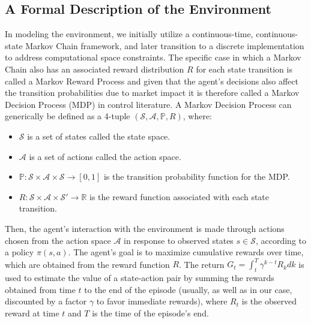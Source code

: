 \subsection{A Formal Description of the Environment}
\label{subsec:formal-description-of-the-rl-environment}
In modeling the environment, we initially utilize a continuous-time, continuous-state Markov Chain framework,
and later transition to a discrete implementation to address computational space constraints.
The specific case in which a Markov Chain also has an associated reward distribution $R$ for each state transition is called a Markov Reward Process
and given that the agent's decisions also affect the transition probabilities due to market impact it is therefore called a Markov Decision Process (MDP) in control literature.
A Markov Decision Process can generically be defined as a 4-tuple $ (\mathcal{S}, \mathcal{A}, \mathbb{P}, R) $, where:

\begin{itemize}
    \item $\mathcal{S}$ is a set of states called the state space.
    \item $\mathcal{A}$ is a set of actions called the action space.
    \item $\mathbb{P}: \mathcal{S} \times \mathcal{A} \times \mathcal{S} \to [0, 1]$ is the transition probability function for the MDP.
    \item $R: \mathcal{S} \times \mathcal{A} \times \mathcal{S}' \rightarrow \mathbb{R}$ is the reward function associated with each state transition.
\end{itemize}

Then, the agent's interaction with the environment is made through actions chosen from the action space $\mathcal{A}$ in response to observed states $s \in \mathcal{S}$,
according to a policy $\pi (s, a)$.
The agent's goal is to maximize cumulative rewards over time, which are obtained from the reward function $R$.
The return $G_t = \int_{t}^{T} \gamma^{k-t} R_{k} dk$ is used to estimate the value of a state-action pair by summing the rewards obtained from time $t$ to the end of the episode
(usually, as well as in our case, discounted by a factor $\gamma$ to favor immediate rewards),
where $R_{t}$ is the observed reward at time $t$ and $T$ is the time of the episode's end.

